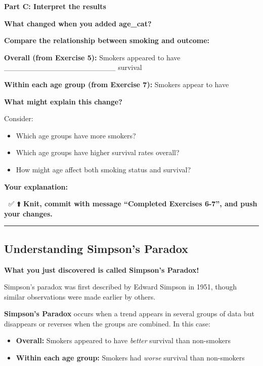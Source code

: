 \documentclass[]{tufte-handout}
\providecommand{\tightlist}{%
  \setlength{\itemsep}{0pt}\setlength{\parskip}{0pt}}
\begin{document}
\textbf{Part C: Interpret the results}

\textbf{What changed when you added age\_cat?}

\textbf{Compare the relationship between smoking and outcome:}

\textbf{Overall (from Exercise 5):} Smokers appeared to have
\_\_\_\_\_\_\_\_\_\_\_\_\_\_\_\_\_\_\_\_\_ survival

\textbf{Within each age group (from Exercise 7):} Smokers appear to have

\textbf{What might explain this change?}

Consider:

\begin{itemize}
\tightlist
\item
  Which age groups have more smokers?
\item
  Which age groups have higher survival rates overall?
\item
  How might age affect both smoking status and survival?
\end{itemize}

\textbf{Your explanation:}

🧶 ✅ ⬆️ \textbf{Knit, commit with message ``Completed Exercises 6-7'',
and push your changes.}

\begin{center}\rule{0.5\linewidth}{0.5pt}\end{center}

\subsection{Understanding Simpson's
Paradox}\label{understanding-simpsons-paradox}

\textbf{What you just discovered is called Simpson's Paradox!}

\begin{marginfigure}
Simpson's paradox was first described by Edward Simpson in 1951, though
similar observations were made earlier by others.
\end{marginfigure}

\textbf{Simpson's Paradox} occurs when a trend appears in several groups
of data but disappears or reverses when the groups are combined. In this
case:

\begin{itemize}
\tightlist
\item
  \textbf{Overall:} Smokers appeared to have \emph{better} survival than
  non-smokers
\item
  \textbf{Within each age group:} Smokers had \emph{worse} survival than
  non-smokers
\end{itemize}
\end{document}
